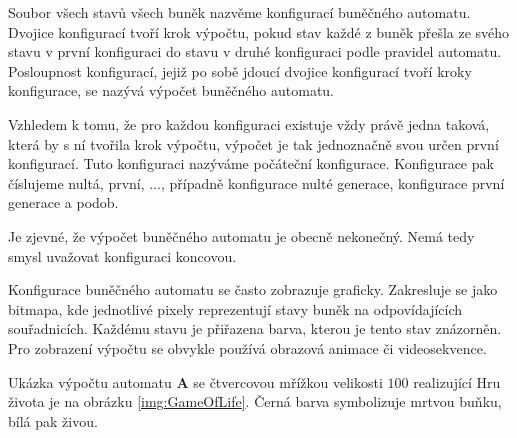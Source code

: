 \documentclass[a4paper,10pt]{article}
\begin{document}
Soubor všech stavů všech buněk nazvěme konfigurací buněčného automatu. Dvojice konfigurací tvoří krok výpočtu, pokud stav každé z buněk přešla ze svého stavu v první konfiguraci do stavu v druhé konfiguraci podle pravidel automatu. Posloupnost konfigurací, jejiž po sobě jdoucí dvojice konfigurací tvoří kroky konfigurace, se nazývá výpočet buněčného automatu.

Vzhledem k tomu, že pro každou konfiguraci existuje vždy právě jedna taková, která by s ní tvořila krok výpočtu, výpočet je tak jednoznačně svou určen první konfigurací. Tuto konfiguraci nazýváme počáteční konfigurace. Konfigurace pak číslujeme nultá, první, $\dots$, případně konfigurace nulté generace, konfigurace první generace a podob.

Je zjevné, že výpočet buněčného automatu je obecně nekonečný. Nemá tedy smysl uvažovat konfiguraci koncovou.

Konfigurace buněčného automatu se často zobrazuje graficky. Zakresluje se jako bitmapa, kde jednotlivé pixely reprezentují stavy buněk na odpovídajících souřadnicích. Každému stavu je přiřazena barva, kterou je tento stav znázorněn. Pro zobrazení výpočtu se obvykle používá obrazová animace či videosekvence.

\begin{example}  
  Ukázka výpočtu automatu $\mathbf{A}$ se čtvercovou mřížkou velikosti $100$ realizující Hru života je na obrázku \ref{img:GameOfLife}. Černá barva symbolizuje mrtvou buňku, bílá pak živou. 
\end{example}
\end{document}
